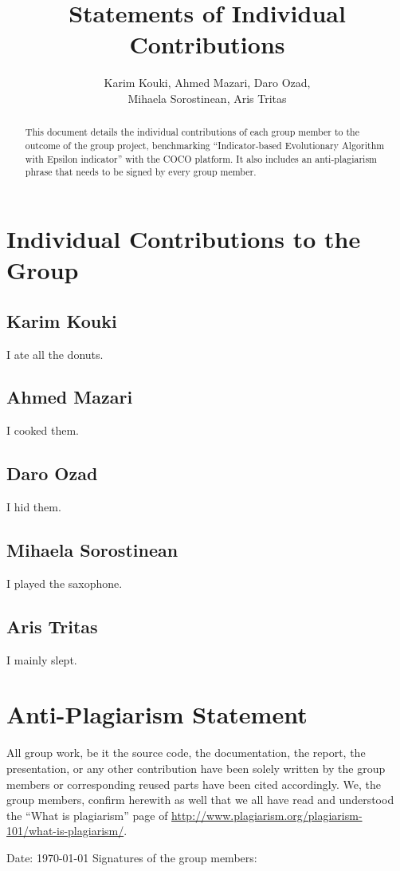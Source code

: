 \documentclass{article}
\begin{document}
\title{Statements of Individual Contributions}
\author{Karim Kouki, Ahmed Mazari, Daro Ozad, \\ Mihaela Sorostinean, Aris Tritas}
\maketitle
\begin{abstract}
This document details the individual contributions of each group member to the outcome of the group project, benchmarking ``Indicator-based Evolutionary Algorithm with Epsilon indicator'' with the COCO platform. It also includes an anti-plagiarism phrase that needs to be signed by every group member.
\end{abstract}


\section{Individual Contributions to the Group}

\subsection*{Karim Kouki}
I ate all the donuts.

\subsection*{Ahmed Mazari}
I cooked them.

\subsection*{Daro Ozad}
I hid them.

\subsection*{Mihaela Sorostinean}
I played the saxophone.

\subsection*{Aris Tritas}
I mainly slept.

\section{Anti-Plagiarism Statement}
All group work, be it the source code, the documentation, the report, the presentation, or any other contribution have been solely written by the group members or corresponding reused parts have been cited accordingly. We, the group members, confirm herewith as well that we all have read and understood the ``What is plagiarism'' page of \url{http://www.plagiarism.org/plagiarism-101/what-is-plagiarism/}.

Date: \today \newline
Signatures of the group members:
\end{document}
